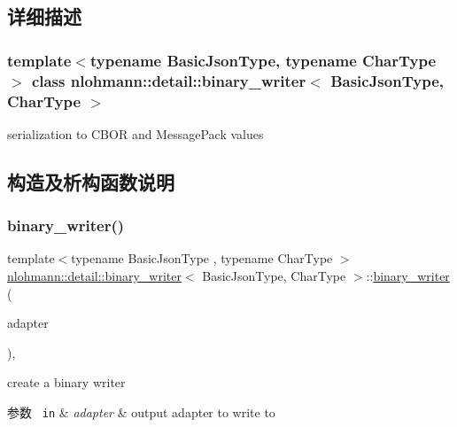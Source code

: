 \subsection{详细描述}
\subsubsection*{template$<$typename Basic\+Json\+Type, typename Char\+Type$>$\newline
class nlohmann\+::detail\+::binary\+\_\+writer$<$ Basic\+Json\+Type, Char\+Type $>$}

serialization to C\+B\+OR and Message\+Pack values 

\subsection{构造及析构函数说明}
\mbox{\label{classnlohmann_1_1detail_1_1binary__writer_a373289af95a946c19bb4a58a5df71a78}} 
\subsubsection{\texorpdfstring{binary\_writer()}{binary\_writer()}}
{\footnotesize\ttfamily template$<$typename Basic\+Json\+Type , typename Char\+Type $>$ \\
\mbox{\hyperlink{classnlohmann_1_1detail_1_1binary__writer}{nlohmann\+::detail\+::binary\+\_\+writer}}$<$ Basic\+Json\+Type, Char\+Type $>$\+::\mbox{\hyperlink{classnlohmann_1_1detail_1_1binary__writer}{binary\+\_\+writer}} (\begin{DoxyParamCaption}\item[{\mbox{\hyperlink{namespacenlohmann_1_1detail_a9b680ddfb58f27eb53a67229447fc556}{output\+\_\+adapter\+\_\+t}}$<$ Char\+Type $>$}]{adapter }\end{DoxyParamCaption})\hspace{0.3cm}{\ttfamily [inline]}, {\ttfamily [explicit]}}



create a binary writer 


\begin{DoxyParams}[1]{参数}
\mbox{\texttt{ in}}  & {\em adapter} & output adapter to write to \\
\hline
\end{DoxyParams}


